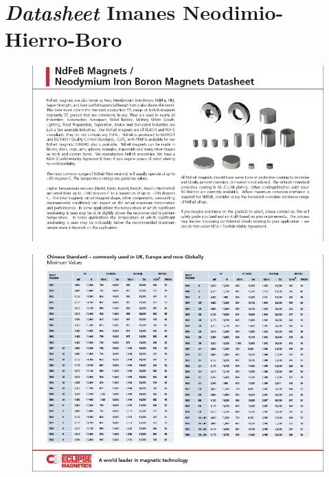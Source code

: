 \chapter{\textit{Datasheet} Imanes Neodimio-Hierro-Boro}

\newpage

\begin{figure}[H]
\centering
	\includegraphics[width=\textwidth]{images/Anexos/fig2}
\end{figure}
\begin{figure}[H]
\centering
	\includegraphics[width=\textwidth]{images/Anexos/fig3}
\end{figure}